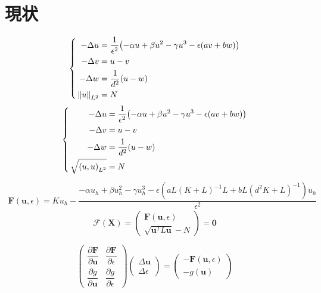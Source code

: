 \documentclass[a4paper, 11pt]{ltjsreport}
\theoremstyle{plain}
\theoremstyle{definition}
\begin{document}
\chapter{現状}
\begin{equation}
  \left\{ \,
      \begin{aligned}
          -\Delta u &= \frac{1}{\epsilon^2}\qty(-\alpha u +\beta u^2 -\gamma u^3 -\epsilon\qty(a v + b w ))\\
          -\Delta v &= u-v \\
          -\Delta w &= \frac{1}{d^2}\qty(u-w)\\
          \norm{u}_{L^2} &= N
      \end{aligned}
  \right.
\end{equation}
\begin{equation}
  \left\{ \,
      \begin{aligned}
          -\Delta u &= \frac{1}{\epsilon^2}\qty(-\alpha u +\beta u^2 -\gamma u^3 -\epsilon\qty(a v + b w ))\\
          -\Delta v &= u-v \\
          -\Delta w &= \frac{1}{d^2}\qty(u-w)\\
          \sqrt{\qty( u, u)_{L^2} } &= N
      \end{aligned}
  \right.
\end{equation}
\begin{align}
   \bm{F}(\bm{u},\epsilon) =Ku_h- \dfrac{-\alpha u_h + \beta  u_h^2 -\gamma  u_h^3-\epsilon(aL(K+L)^{-1}L+bL(d^2K+L)^{-1}) u_h}{\epsilon^2}
\end{align}
\begin{equation}
    \bm{\mathcal{F}}(\bm{X}) = 
    \begin{pmatrix}
        \bm{F}(\bm{u}, \epsilon) \\
        \sqrt{\bm{u}^T L \bm{u}} - N
    \end{pmatrix}
    = \bm{0}
\end{equation}

\newpage
\begin{equation}
    \begin{pmatrix}
        \dfrac{\partial \bm{F}}{\partial \bm{u}} & \dfrac{\partial \bm{F}}{\partial \epsilon} \\[10pt]
        \dfrac{\partial g}{\partial \bm{u}} & \dfrac{\partial g}{\partial \epsilon}
    \end{pmatrix}
    \begin{pmatrix}
        \Delta \bm{u} \\
        \Delta \epsilon
    \end{pmatrix}
    =
    \begin{pmatrix}
        -\bm{F}(\bm{u}, \epsilon) \\
        -g(\bm{u})
    \end{pmatrix}
\end{equation}
\end{document}
